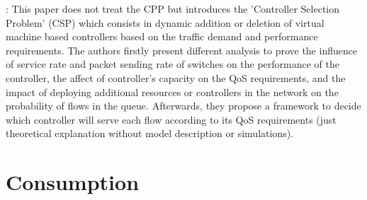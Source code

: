 \documentclass[a4paper,10pt]{article}
\begin{document}
\cite{SoXi17}: This paper does not treat the CPP but introduces the 'Controller Selection Problem' (CSP) which consists in dynamic addition or deletion of virtual machine based controllers based on the traffic demand and performance requirements. The authors firstly present different analysis to prove the influence of service rate and packet sending rate of switches on the performance of the controller, the affect of controller's capacity on the QoS requirements, and the impact of deploying additional resources or controllers in the network on the probability of flows in the queue. Afterwards, they propose a framework to decide which controller will serve each flow according to its QoS requirements (just theoretical explanation without model description or simulations). 




\section{Consumption}
\end{document}
